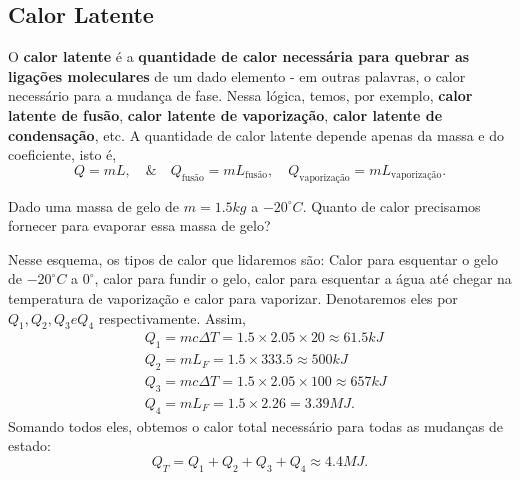 \documentclass[phsyicsII_notes.tex]{subfiles}
\begin{document}
\subsection{Calor Latente}
O \textbf{calor latente} é a \textbf{quantidade de calor necessária para quebrar as ligações moleculares} de um dado elemento - em outras palavras,
o calor necessário para a mudança de fase. Nessa lógica, temos, por exemplo, \textbf{calor latente de fusão}, \textbf{calor latente de vaporização},
\textbf{calor latente de condensação}, etc. A quantidade de calor latente depende apenas da massa e do coeficiente, isto é,
\[
	Q = mL,\quad\&\quad Q_{\text{fusão}} = mL_{\text{fusão}},\quad Q_{\text{vaporização}} = m L_{\text{vaporização}}.
\]
\begin{example}
	Dado uma massa de gelo de \(m = 1.5kg\) a \(-20^{\circ{}}C\). Quanto de calor precisamos fornecer para evaporar essa massa de gelo?

	Nesse esquema, os tipos de calor que lidaremos são: Calor para esquentar o gelo de \(-20^{\circ{}}C\) a \(0^{\circ{}}\), calor para fundir o gelo, calor para esquentar a água até chegar na temperatura
	de vaporização e calor para vaporizar. Denotaremos eles por \(Q_{1}, Q_{2}, Q_{3} e Q_{4}\)
	respectivamente. Assim,
	\begin{align*}
		 & Q_{1} = mc\Delta T = 1.5\times 2.05\times 20\approx 61.5kJ \\
		 & Q_{2} = mL_{F} = 1.5\times 333.5\approx 500kJ              \\
		 & Q_{3} = mc\Delta T = 1.5\times 2.05\times 100\approx 657kJ \\
		 & Q_{4} = mL_{F} = 1.5\times 2.26 = 3.39MJ.
	\end{align*}
	Somando todos eles, obtemos o calor total necessário para todas as mudanças de estado:
	\[
		Q_{T} = Q_{1} + Q_{2} + Q_{3} + Q_{4}\approx 4.4MJ.
	\]
\end{example}
\end{document}

